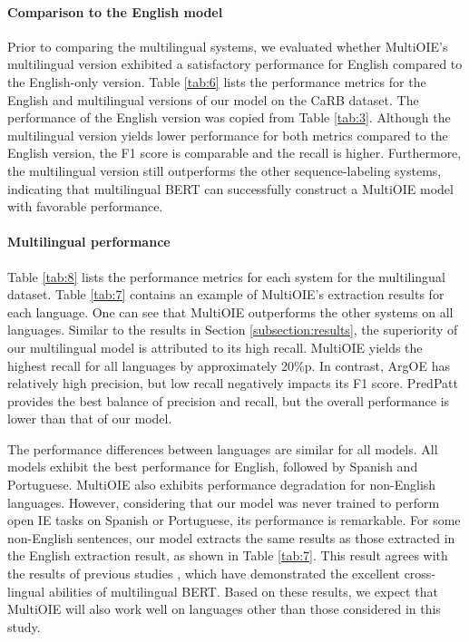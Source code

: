 \documentclass[11pt,a4paper]{article}
\begin{document}
\paragraph{Comparison to the English model}
Prior to comparing the multilingual systems, we evaluated whether MultiOIE's multilingual version exhibited a satisfactory performance for English compared to the English-only version.
Table \ref{tab:6} lists the performance metrics for the English and multilingual versions of our model on the CaRB dataset.
The performance of the English version was copied from Table \ref{tab:3}.
Although the multilingual version yields lower performance for both metrics compared to the English version, the F1 score is comparable and the recall is higher.
Furthermore, the multilingual version still outperforms the other sequence-labeling systems, indicating that multilingual BERT can successfully construct a MultiOIE model with favorable performance.

\paragraph{Multilingual performance}
Table \ref{tab:8} lists the performance metrics for each system for the multilingual dataset.
Table \ref{tab:7} contains an example of MultiOIE's extraction results for each language.
One can see that MultiOIE outperforms the other systems on all languages.
Similar to the results in Section \ref{subsection:results}, the superiority of our multilingual model is attributed to its high recall.
MultiOIE yields the highest recall for all languages by approximately 20\%p.
In contrast, ArgOE has relatively high precision, but low recall negatively impacts its F1 score.
PredPatt provides the best balance of precision and recall, but the overall performance is lower than that of our model.

The performance differences between languages are similar for all models.
All models exhibit the best performance for English, followed by Spanish and Portuguese.
MultiOIE also exhibits performance degradation for non-English languages.
However, considering that our model was never trained to perform open IE tasks on Spanish or Portuguese, its performance is remarkable.
For some non-English sentences, our model extracts the same results as those extracted in the English extraction result, as shown in Table \ref{tab:7}.
This result agrees with the results of previous studies \citep{pires-etal-2019-multilingual,wu-dredze-2019-beto,Karthikeyan2020CrossLingualAO}, which have demonstrated the excellent cross-lingual abilities of multilingual BERT.
Based on these results, we expect that MultiOIE will also work well on languages other than those considered in this study.
\end{document}
